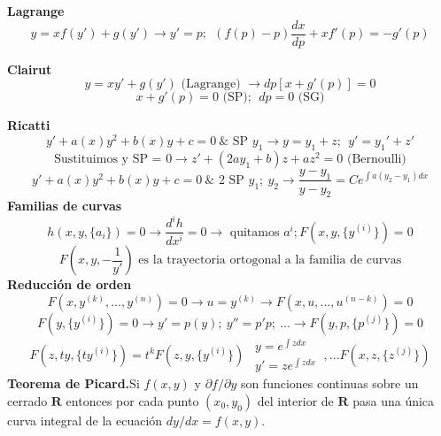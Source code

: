 \documentclass[10pt,landscape,letterpaper]{article}
\begin{document}
\begin{multicols}{3}
\textbf{Lagrange}
\vspace{-10pt}
\[y=xf(y')+g(y') \rightarrow y'=p; \ \ \boxed{(f(p)-p) \frac{dx}{dp} +xf'(p)=-g'(p)}\]
\vspace{-10pt}

\textbf{Clairut}
\vspace{-8pt}
\[y=xy'+g(y') \mbox{ (Lagrange) }  \rightarrow dp [x+g'(p)]=0\]
\[x+g'(p) = 0 \mbox{ (SP)}; \ \ dp = 0 \mbox{ (SG)}\]
\vspace{-19pt}

\textbf{Ricatti}
\vspace{-5pt}
\[y' + a(x)y^2+b(x)y+c=0 \ \& \mbox{ SP } y_1 \rightarrow y = y_1 +z; \ \ y' = y_1'+z' \]
\[\mbox{Sustituimos y SP = 0} \rightarrow \boxed{z'+(2a y_1 +b)z +az^2=0} \mbox{ (Bernoulli)}\]
\[y' + a(x)y^2+b(x)y+c=0 \ \& \mbox{ 2 SP } y_1; \ y_2 \rightarrow \boxed{\frac{y-y_1}{y-y_2}=Ce^{\int{a(y_2-y_1)dx}}}\]%
\textbf{Familias de curvas}
\vspace{-9pt}
\[h(x,y,\{a_i\})=0 \rightarrow \frac{d^i h}{dx^i} =0 \rightarrow \mbox{ quitamos } {a^i};  F\left(x,y,\{y^{(i)}\}\right)=0\]
\vspace{-10pt}
\[F\left(x,y,-\frac{1}{y'}\right) \mbox{ es la trayectoria ortogonal a la familia de curvas}\]%
\textbf{Reducción de orden}
\[F(x,y^{(k)},\dots,y^{(n)})=0\rightarrow u=y^{(k)} \rightarrow F(x,u,\dots,u^{(n-k)})=0\]
\[F(y,\{y^{(i)}\})=0 \rightarrow y'=p(y); \ y''=p'p; \  \dots \rightarrow F(y,p,\{p^{(j)}\})=0\]
\[F(z,ty,\{ty^{(i)}\})=t^k F(z,y,\{y^{(i)}\}) \ \ \begin{matrix}
  y=e^{\int{z dx}} \\ y'=z e^{\int{z dx}}
\end{matrix} \ , ... F(x,z,\{z^{(j)}\})\]%
\textbf{Teorema de Picard.}Si $f(x,y)$ y $\partial f / \partial y$ son funciones continuas sobre un cerrado $\mathbf{R}$ entonces por cada punto $(x_0,y_0)$ del interior de $\mathbf{R}$ pasa una única curva integral de la ecuación $dy/dx = f(x,y)$.


\end{multicols}
\end{document}
